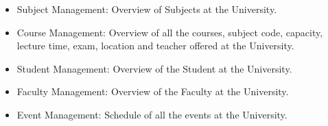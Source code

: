 \begin{itemize}
    \item Subject Management: Overview of Subjects at the University.
    \item Course Management: Overview of all the courses, subject code, capacity, lecture time, exam, location and teacher offered at the University.
    \item Student Management: Overview of the Student at the University.
    \item Faculty Management: Overview of the Faculty at the University.
    \item Event Management: Schedule of all the events at the University.
\end{itemize}

\begin{figure}[h!]
    \centering

\end{figure}
